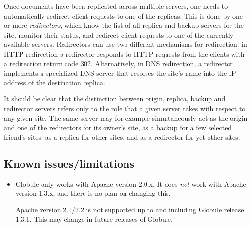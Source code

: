 \documentclass[10pt,a4paper]{article}
\makeatletter
\newenvironment{p}{\@open{P}{}}{\@close{P}}
\newenvironment{p}{}{\par}
\makeatother
\begin{document}
\begin{p}
\label{sec:intro:term:redirector} Once documents have been replicated 
across multiple servers, one needs to automatically redirect client requests
to one of the replicas. This is done by one or more \emph{redirectors},
which know the list of all replica and backup servers for the site, monitor
their status, and redirect client requests to one of the currently available
servers.  Redirectors can use two different mechanisms for redirection: in
HTTP redirection a redirector responds to HTTP requests from the clients with
a redirection return code 302.  Alternatively, in DNS redirection, a
redirector implements a specialized DNS server that resolves the site's name
into the IP address of the destination replica.


\end{p}

\begin{p}
It should be clear that the distinction between origin, replica, backup and
redirector servers refers only to the role that a given server takes with
respect to any given site. The same server may for example simultaneously act
as the origin and one of the redirectors for its owner's site, as a backup for
a few selected friend's sites, as a replica for other sites, and as a
redirector for yet other sites.
\end{p}


\subsection{Known issues/limitations}

\begin{p}
\begin{itemize}
\item Globule only works with Apache version 2.0.x. It does \emph{not}
  work with Apache version 1.3.x, and there is no plan on changing
  this.

  Apache version 2.1/2.2 is not supported up to and including Globule release
  1.3.1.  This may change in future releases of Globule.
\end{itemize}
\end{p}

\end{document}
